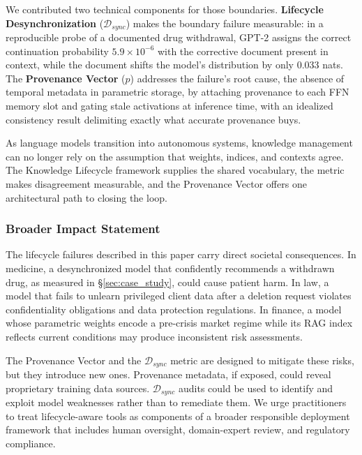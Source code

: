 \documentclass[10pt]{article}
\begin{document}
We contributed two technical components for those boundaries. \textbf{Lifecycle Desynchronization} ($\mathcal{D}_{sync}$) makes the boundary failure measurable: in a reproducible probe of a documented drug withdrawal, GPT-2 assigns the correct continuation probability $5.9 \times 10^{-6}$ with the corrective document present in context, while the document shifts the model's distribution by only $0.033$ nats. The \textbf{Provenance Vector} ($p$) addresses the failure's root cause, the absence of temporal metadata in parametric storage, by attaching provenance to each FFN memory slot and gating stale activations at inference time, with an idealized consistency result delimiting exactly what accurate provenance buys.

As language models transition into autonomous systems, knowledge management can no longer rely on the assumption that weights, indices, and contexts agree. The Knowledge Lifecycle framework supplies the shared vocabulary, the metric makes disagreement measurable, and the Provenance Vector offers one architectural path to closing the loop.

\subsubsection*{Broader Impact Statement}

The lifecycle failures described in this paper carry direct societal consequences. In medicine, a desynchronized model that confidently recommends a withdrawn drug, as measured in \S\ref{sec:case_study}, could cause patient harm. In law, a model that fails to unlearn privileged client data after a deletion request violates confidentiality obligations and data protection regulations. In finance, a model whose parametric weights encode a pre-crisis market regime while its RAG index reflects current conditions may produce inconsistent risk assessments.

The Provenance Vector and the $\mathcal{D}_{sync}$ metric are designed to mitigate these risks, but they introduce new ones. Provenance metadata, if exposed, could reveal proprietary training data sources. $\mathcal{D}_{sync}$ audits could be used to identify and exploit model weaknesses rather than to remediate them. We urge practitioners to treat lifecycle-aware tools as components of a broader responsible deployment framework that includes human oversight, domain-expert review, and regulatory compliance.



\end{document}
